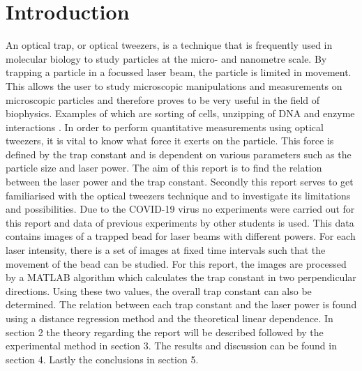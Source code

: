 \section{Introduction}

An optical trap, or optical tweezers, is a technique that is frequently used in molecular biology to study particles at the micro- and nanometre scale. By trapping a particle in a focussed laser beam, the particle is limited in movement. This allows the user to study microscopic manipulations and measurements on microscopic particles and therefore proves to be very useful in the field of biophysics. Examples of which are sorting of cells, unzipping of DNA and enzyme interactions \cite{MIT}\cite{Velthuis}.
In order to perform quantitative measurements using optical tweezers, it is vital to know what force it exerts on the particle. This force is defined by the trap constant and is dependent on various parameters such as the particle size and laser power. 
The aim of this report is to find the relation between the laser power and the trap constant. Secondly this report serves to get familiarised with the optical tweezers technique and to investigate its limitations and possibilities. 
Due to the COVID-19 virus no experiments were carried out for this report and data of previous experiments by other students is used. This data contains images of a trapped bead for laser beams with different powers. For each laser intensity, there is a set of images at fixed time intervals such that the movement of the bead can be studied. For this report, the images are processed by a MATLAB algorithm which calculates the trap constant in two perpendicular directions. Using these two values, the overall trap constant can also be determined. The relation between each trap constant and the laser power is found using a distance regression method and the theoretical linear dependence.
In section 2 the theory regarding the report will be described followed by the experimental method in section 3. The results and discussion can be found in section 4. Lastly the conclusions in section 5.








